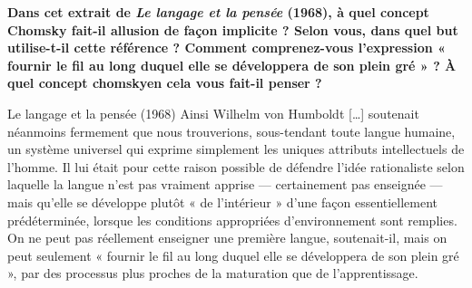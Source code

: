 \begin{keybox}[V]
\textbf{Dans cet extrait de \textit{Le langage et la pensée} (1968), à quel concept Chomsky fait-il allusion de façon implicite ? Selon vous, dans quel but utilise-t-il cette référence ? Comment comprenez-vous l’expression « fournir le fil au long duquel elle se développera de son plein gré » ? À quel concept chomskyen cela vous fait-il penser ?}
\begin{lecture}{Le langage et la pensée (1968)}
Ainsi Wilhelm von Humboldt […] soutenait néanmoins fermement que nous trouverions, sous-tendant toute langue humaine, un système universel qui exprime simplement les uniques attributs intellectuels de l’homme. Il lui était pour cette raison possible de défendre l’idée rationaliste selon laquelle la langue n’est pas vraiment apprise — certainement pas enseignée — mais qu’elle se développe plutôt « de l’intérieur » d’une façon essentiellement prédéterminée, lorsque les conditions appropriées d’environnement sont remplies. On ne peut pas réellement enseigner une première langue, soutenait-il, mais on peut seulement « fournir le fil au long duquel elle se développera de son plein gré », par des processus plus proches de la maturation que de l’apprentissage.
\end{lecture}
\end{keybox}

